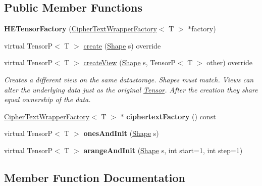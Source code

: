 \subsection*{Public Member Functions}
\begin{DoxyCompactItemize}
\item 
\mbox{\label{classHETensorFactory_a5bc8ec357ccf999794e32e8e98ee8b01}} 
{\bfseries H\+E\+Tensor\+Factory} (\hyperlink{classCipherTextWrapperFactory}{Cipher\+Text\+Wrapper\+Factory}$<$ T $>$ $\ast$factory)
\item 
virtual TensorP$<$ T $>$ \hyperlink{classHETensorFactory_a7becf968bdd7110f8f1ba7c2d212a69f}{create} (\hyperlink{classShape}{Shape} s) override
\item 
virtual TensorP$<$ T $>$ \hyperlink{classHETensorFactory_a9c8d6f82f1cbbdf497eb784b0c417f03}{create\+View} (\hyperlink{classShape}{Shape} s, TensorP$<$ T $>$ other) override
\begin{DoxyCompactList}\small\item\em Creates a different view on the same datastorage. Shapes must match. Views can alter the underlying data just as the original \hyperlink{classTensor}{Tensor}. After the creation they share equal ownership of the data. \end{DoxyCompactList}\item 
\mbox{\label{classHETensorFactory_a73bfc12f4c1b6066da183e469dbb1d2c}} 
\hyperlink{classCipherTextWrapperFactory}{Cipher\+Text\+Wrapper\+Factory}$<$ T $>$ $\ast$ {\bfseries ciphertext\+Factory} () const
\item 
\mbox{\label{classHETensorFactory_abc9704a42a96acc8b195853c8c2e9a9a}} 
virtual TensorP$<$ T $>$ {\bfseries ones\+And\+Init} (\hyperlink{classShape}{Shape} s)
\item 
\mbox{\label{classHETensorFactory_a7793cc289ab6ab739ed9e3b416dd4b22}} 
virtual TensorP$<$ T $>$ {\bfseries arange\+And\+Init} (\hyperlink{classShape}{Shape} s, int start=1, int step=1)
\end{DoxyCompactItemize}


\subsection{Member Function Documentation}
\mbox{\label{classHETensorFactory_a7becf968bdd7110f8f1ba7c2d212a69f}} 
